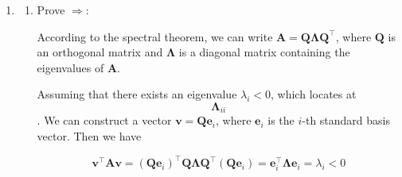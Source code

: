 \documentclass[10pt,a4paper]{article}
\begin{document}
\begin{enumerate}
\begin{enumerate}
        $$
        \begin{aligned}
        &f(\alpha\mathbf{x}+(1-\alpha)\mathbf{y}) - (\alpha f(\mathbf{x})+(1-\alpha)f(\mathbf{y})) \\
        =& \frac12 (\alpha\mathbf{x}+(1-\alpha)\mathbf{y})^\top\mathbf{A}(\alpha\mathbf{x}+(1-\alpha)\mathbf{y}) - \frac12 \alpha \mathbf{x}^\top\mathbf{A}\mathbf{x} - \frac12 (1-\alpha) \mathbf{y}^\top\mathbf{A}\mathbf{y} \\
        =& \frac12 \left( \alpha^2 \mathbf{x}^\top\mathbf{A}\mathbf{x} + 2\alpha(1-\alpha) \mathbf{x}^\top\mathbf{A}\mathbf{y} + (1-\alpha)^2 \mathbf{y}^\top\mathbf{A}\mathbf{y} - \alpha \mathbf{x}^\top\mathbf{A}\mathbf{x} - (1-\alpha) \mathbf{y}^\top\mathbf{A}\mathbf{y} \right) \\
        =& \frac12 \left( -\alpha(1-\alpha) \mathbf{x}^\top\mathbf{A}\mathbf{x} + 2\alpha(1-\alpha) \mathbf{x}^\top\mathbf{A}\mathbf{y} - \alpha(1-\alpha) \mathbf{y}^\top\mathbf{A}\mathbf{y} \right) \\
        =& \frac12 \alpha(1-\alpha) \left( -\mathbf{x}^\top\mathbf{A}\mathbf{x} + 2 \mathbf{x}^\top\mathbf{A}\mathbf{y} - \mathbf{y}^\top\mathbf{A}\mathbf{y} \right) \\
        =& \frac12 \alpha(1-\alpha) \left( -(\mathbf{x}-\mathbf{y})^\top\mathbf{A}(\mathbf{x}-\mathbf{y}) \right) \\
        \leq& 0
        \end{aligned}
        $$

        As a result, $f(\mathbf{x})$ is convex.
    \end{enumerate}

    \item[2. ]

    \begin{enumerate}
        \item[] Prove $\Rightarrow$:

        According to the spectral theorem, we can write $\mathbf{A} = \mathbf{Q}\boldsymbol{\Lambda}\mathbf{Q}^\top$, where $\mathbf{Q}$ is an orthogonal matrix and $\boldsymbol{\Lambda}$ is a diagonal matrix containing the eigenvalues of $\mathbf{A}$.

        Assuming that there exists an eigenvalue $\lambda_i < 0$, which locates at $$\boldsymbol{\Lambda}_{ii}$$. We can construct a vector $\mathbf{v} = \mathbf{Q}\mathbf{e}_i$, where $\mathbf{e}_i$ is the $i$-th standard basis vector. Then we have
        
        $$
        \mathbf{v}^\top \mathbf{A} \mathbf{v} = (\mathbf{Q}\mathbf{e}_i)^\top \mathbf{Q}\boldsymbol{\Lambda}\mathbf{Q}^\top (\mathbf{Q}\mathbf{e}_i) = \mathbf{e}_i^\top \boldsymbol{\Lambda} \mathbf{e}_i = \lambda_i < 0
        $$


\end{enumerate}
\end{enumerate}
\end{document}
